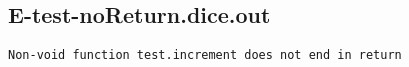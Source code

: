 \subsection{E-test-noReturn.dice.out}
\begin{verbatim}
Non-void function test.increment does not end in return

\end{verbatim}